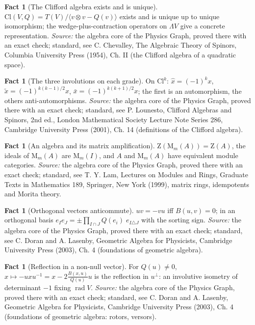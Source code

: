 \documentclass[11pt]{article}
\theoremstyle{definition}
\newtheorem{fact}[theorem]{Fact}
\theoremstyle{plain}
\providecommand{\Cl}{}\renewcommand{\Cl}{\mathrm{Cl}}
\providecommand{\Mat}{}\renewcommand{\Mat}{\mathrm{M}}
\providecommand{\Zc}{}\renewcommand{\Zc}{\mathrm{Z}}
\begin{document}
\begin{fact}[The Clifford algebra exists and is unique]\label{c:std-algebra.existence-uniqueness}
$\Cl(V, Q) = T(V)/\langle v \otimes v - Q(v) \rangle$ exists and is unique up to unique isomorphism; the wedge-plus-contraction operators on $\Lambda V$ give a concrete representation.
\emph{Source:} the algebra core of the Physics Graph, proved there with an exact check; standard, see C. Chevalley, The Algebraic Theory of Spinors, Columbia University Press (1954), Ch. II (the Clifford algebra of a quadratic space).
\end{fact}

\begin{fact}[The three involutions on each grade]\label{c:std-algebra.involution-properties}
On $\Cl^{k}$: $\hat{x} = (-1)^{k}x$, $\tilde{x} = (-1)^{k(k-1)/2}x$, $\bar{x} = (-1)^{k(k+1)/2}x$; the first is an automorphism, the others anti-automorphisms.
\emph{Source:} the algebra core of the Physics Graph, proved there with an exact check; standard, see P. Lounesto, Clifford Algebras and Spinors, 2nd ed., London Mathematical Society Lecture Note Series 286, Cambridge University Press (2001), Ch. 14 (definitions of the Clifford algebra).
\end{fact}

\begin{fact}[An algebra and its matrix amplification]\label{c:std-algebra.morita-amplification}
$\Zc(\Mat_m(A)) = \Zc(A)$, the ideals of $\Mat_m(A)$ are $\Mat_m(I)$, and $A$ and $\Mat_m(A)$ have equivalent module categories.
\emph{Source:} the algebra core of the Physics Graph, proved there with an exact check; standard, see T. Y. Lam, Lectures on Modules and Rings, Graduate Texts in Mathematics 189, Springer, New York (1999), matrix rings, idempotents and Morita theory.
\end{fact}

\begin{fact}[Orthogonal vectors anticommute]\label{c:std-algebra.orthogonal-anticommute}
$uv = -vu$ iff $B(u,v) = 0$; in an orthogonal basis $e_I e_J = \pm \prod_{I \cap J} Q(e_i)\; e_{I \triangle J}$ with the sorting sign.
\emph{Source:} the algebra core of the Physics Graph, proved there with an exact check; standard, see C. Doran and A. Lasenby, Geometric Algebra for Physicists, Cambridge University Press (2003), Ch. 4 (foundations of geometric algebra).
\end{fact}

\begin{fact}[Reflection in a non-null vector]\label{c:std-algebra.reflection}
For $Q(u) \ne 0$, $x \mapsto -uxu^{-1} = x - 2\frac{B(x,u)}{Q(u)}u$ is the reflection in $u^{\perp}$: an involutive isometry of determinant $-1$ fixing $\operatorname{rad} V$.
\emph{Source:} the algebra core of the Physics Graph, proved there with an exact check; standard, see C. Doran and A. Lasenby, Geometric Algebra for Physicists, Cambridge University Press (2003), Ch. 4 (foundations of geometric algebra: rotors, versors).
\end{fact}
\end{document}
